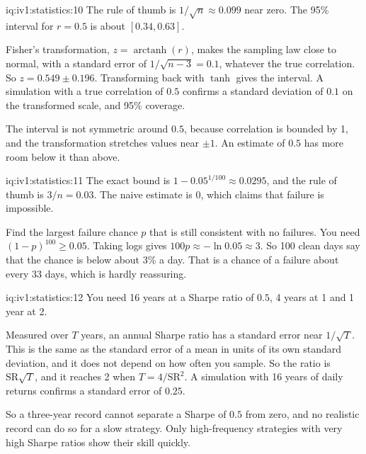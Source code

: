 \begin{solution}{iq:iv1:statistics:10}
The rule of thumb is $1/\sqrt{n} \approx 0.099$ near zero. The 95\% interval for $r = 0.5$ is about $[0.34, 0.63]$.

Fisher's transformation, $z = \operatorname{arctanh}(r)$, makes the sampling law close to normal, with a standard error of $1/\sqrt{n - 3} = 0.1$, whatever the true correlation. So $z = 0.549 \pm 0.196$. Transforming back with $\tanh$ gives the interval. A simulation with a true correlation of $0.5$ confirms a standard deviation of $0.1$ on the transformed scale, and 95\% coverage.

The interval is not symmetric around $0.5$, because correlation is bounded by 1, and the transformation stretches values near $\pm 1$. An estimate of $0.5$ has more room below it than above.

\end{solution}

\begin{solution}{iq:iv1:statistics:11}
The exact bound is $1 - 0.05^{1/100} \approx 0.0295$, and the rule of thumb is $3/n = 0.03$. The naive estimate is 0, which claims that failure is impossible.

Find the largest failure chance $p$ that is still consistent with no failures. You need $(1 - p)^{100} \ge 0.05$. Taking logs gives $100p \approx -\ln 0.05 \approx 3$. So 100 clean days say that the chance is below about 3\% a day. That is a chance of a failure about every 33 days, which is hardly reassuring.

\end{solution}

\begin{solution}{iq:iv1:statistics:12}
You need 16 years at a Sharpe ratio of $0.5$, 4 years at 1 and 1 year at 2.

Measured over $T$ years, an annual Sharpe ratio has a standard error near $1/\sqrt{T}$. This is the same as the standard error of a mean in units of its own standard deviation, and it does not depend on how often you sample. So the ratio is $\mathrm{SR}\sqrt{T}$, and it reaches 2 when $T = 4/\mathrm{SR}^2$. A simulation with 16 years of daily returns confirms a standard error of $0.25$.

So a three-year record cannot separate a Sharpe of $0.5$ from zero, and no realistic record can do so for a slow strategy. Only high-frequency strategies with very high Sharpe ratios show their skill quickly.

\end{solution}

